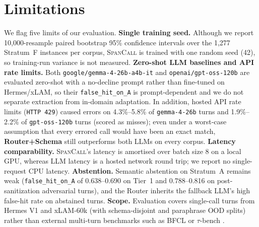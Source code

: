 \section*{Limitations}

We flag five limits of our evaluation. \textbf{Single training seed.} Although we report 10,000-resample paired bootstrap 95\% confidence intervals over the 1,277 Stratum~F instances per corpus, \textsc{SpanCall} is trained with one random seed (42), so training-run variance is not measured. \textbf{Zero-shot LLM baselines and API rate limits.} Both \texttt{google/gemma-4-26b-a4b-it} and \texttt{openai/gpt-oss-120b} are evaluated zero-shot with a no-decline prompt rather than fine-tuned on Hermes/xLAM, so their \texttt{false\_hit\_on\_A} is prompt-dependent and we do not separate extraction from in-domain adaptation. In addition, hosted API rate limits (\texttt{HTTP 429}) caused errors on 4.3\%--5.8\% of \texttt{gemma-4-26b} turns and 1.9\%--2.2\% of \texttt{gpt-oss-120b} turns (scored as misses); even under a worst-case assumption that every errored call would have been an exact match, \textbf{Router+Schema} still outperforms both LLMs on every corpus. \textbf{Latency comparability.} \textsc{SpanCall}'s latency is amortised over batch size 8 on a local GPU, whereas LLM latency is a hosted network round trip; we report no single-request CPU latency. \textbf{Abstention.} Semantic abstention on Stratum~A remains weak (\texttt{false\_hit\_on\_A} of 0.638--0.690 on Tier~1 and 0.788--0.816 on post-sanitization adversarial turns), and the Router inherits the fallback LLM's high false-hit rate on abstained turns. \textbf{Scope.} Evaluation covers single-call turns from Hermes V1 and xLAM-60k (with schema-disjoint and paraphrase OOD splits) rather than external multi-turn benchmarks such as BFCL \citep{yan2024bfcl} or $\tau$-bench \citep{yao2025taubench}.